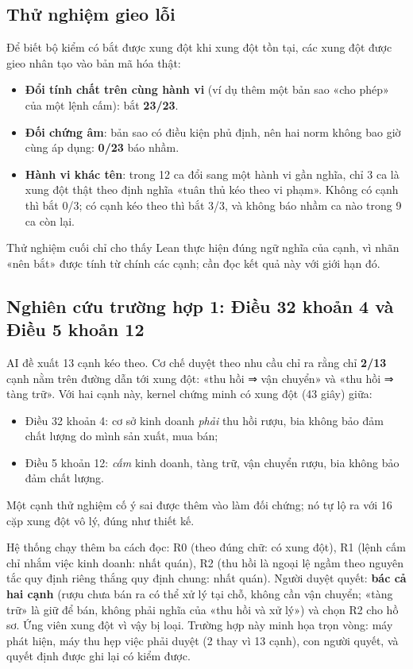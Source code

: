 \documentclass[12pt,a4paper]{article}
\begin{document}
\subsection{Thử nghiệm gieo lỗi}

Để biết bộ kiểm có bắt được xung đột khi xung đột tồn tại, các xung đột được gieo nhân tạo vào bản mã hóa thật:
\begin{itemize}
  \item \textbf{Đổi tính chất trên cùng hành vi} (ví dụ thêm một bản sao «cho phép» của một lệnh cấm): bắt \textbf{23/23}.
  \item \textbf{Đối chứng âm}: bản sao có điều kiện phủ định, nên hai norm không bao giờ cùng áp dụng: \textbf{0/23} báo
    nhầm.
  \item \textbf{Hành vi khác tên}: trong 12 ca đổi sang một hành vi gần nghĩa, chỉ 3 ca là xung đột thật theo định nghĩa «tuân
    thủ kéo theo vi phạm». Không có cạnh thì bắt 0/3; có cạnh kéo theo thì bắt 3/3, và không báo nhầm ca nào trong 9 ca còn
    lại.
\end{itemize}
Thử nghiệm cuối chỉ cho thấy Lean thực hiện đúng ngữ nghĩa của cạnh, vì nhãn «nên bắt» được tính từ chính các cạnh; cần đọc
kết quả này với giới hạn đó.

\subsection{Nghiên cứu trường hợp 1: Điều 32 khoản 4 và Điều 5 khoản 12}

AI đề xuất 13 cạnh kéo theo. Cơ chế duyệt theo nhu cầu chỉ ra rằng chỉ \textbf{2/13} cạnh nằm trên đường dẫn tới xung đột:
«thu hồi ⇒ vận chuyển» và «thu hồi ⇒ tàng trữ». Với hai cạnh này, kernel chứng minh có xung đột (43 giây) giữa:
\begin{itemize}
  \item Điều 32 khoản 4: cơ sở kinh doanh \emph{phải} thu hồi rượu, bia không bảo đảm chất lượng do mình sản xuất, mua bán;
  \item Điều 5 khoản 12: \emph{cấm} kinh doanh, tàng trữ, vận chuyển rượu, bia không bảo đảm chất lượng.
\end{itemize}
Một cạnh thử nghiệm cố ý sai được thêm vào làm đối chứng; nó tự lộ ra với 16 cặp xung đột vô lý, đúng như thiết kế.

Hệ thống chạy thêm ba cách đọc: R0 (theo đúng chữ: có xung đột), R1 (lệnh cấm chỉ nhắm việc kinh doanh: nhất quán), R2
(thu hồi là ngoại lệ ngầm theo nguyên tắc quy định riêng thắng quy định chung: nhất quán). Người duyệt quyết: \textbf{bác cả
hai cạnh} (rượu chưa bán ra có thể xử lý tại chỗ, không cần vận chuyển; «tàng trữ» là giữ để bán, không phải nghĩa của «thu hồi
và xử lý») và chọn R2 cho hồ sơ. Ứng viên xung đột vì vậy bị loại. Trường hợp này minh họa trọn vòng: máy phát hiện, máy thu
hẹp việc phải duyệt (2 thay vì 13 cạnh), con người quyết, và quyết định được ghi lại có kiểm được.
\end{document}
